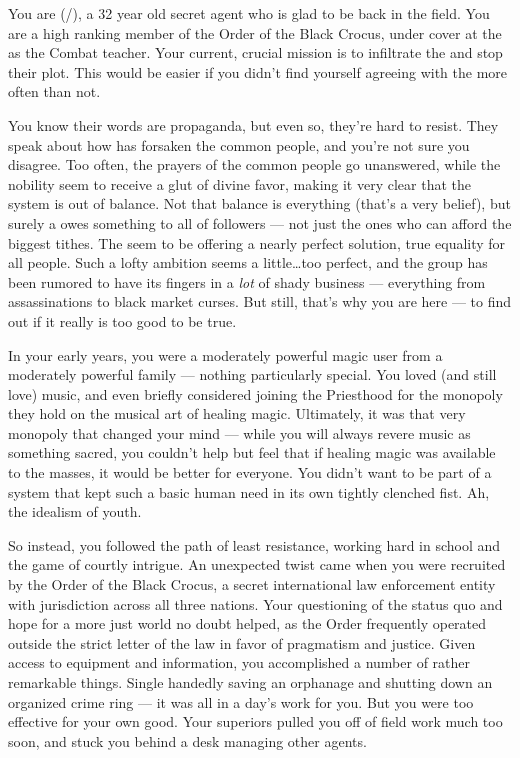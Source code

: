 \documentclass[char]{GL2020}
\begin{document}
\name{\cInterpol{}}

You are \cInterpol{\full} (\cInterpol{\they}/\cInterpol{\them}), a 32 year old secret agent who is glad to be back in the field. You are a high ranking member of the Order of the Black Crocus, under cover at the \pSchool{} as the Combat teacher. Your current, crucial mission is to infiltrate the \pGoaties{} and stop their plot. This would be easier if you didn't find yourself agreeing with the \pGoaties{} more often than not.

You know their words are propaganda, but even so, they're hard to resist. They speak about how \cFarmGod{} has forsaken the common people, and you're not sure you disagree. Too often, the prayers of the common people go unanswered, while the nobility seem to receive a glut of divine favor, making it very clear that the system is out of balance. Not that balance is everything (that's a very \pShippie{} belief), but surely a \cFarmGod{\God} owes something to all of \cFarmGod{\their} followers — not just the ones who can afford the biggest tithes. The \pGoaties{} seem to be offering a nearly perfect solution, true equality for all people. Such a lofty ambition seems a little\ldots{}too perfect, and the group has been rumored to have its fingers in a \emph{lot} of shady business — everything from assassinations to black market curses. But still, that's why you are here — to find out if it really is too good to be true.

In your early years, you were a moderately powerful magic user from a moderately powerful family — nothing particularly special. You loved (and still love) music, and even briefly considered joining the Priesthood for the monopoly they hold on the musical art of healing magic. Ultimately, it was that very monopoly that changed your mind — while you will always revere music as something sacred, you couldn't help but feel that if healing magic was available to the masses, it would be better for everyone. You didn't want to be part of a system that kept such a basic human need in its own tightly clenched fist. Ah, the idealism of youth. 

So instead, you followed the path of least resistance, working hard in school and the game of courtly intrigue. An unexpected twist came when you were recruited by the Order of the Black Crocus, a secret international law enforcement entity with jurisdiction across all three nations. Your questioning of the status quo and hope for a more just world no doubt helped, as the Order frequently operated outside the strict letter of the law in favor of pragmatism and justice. Given access to equipment and information, you accomplished a number of rather remarkable things. Single handedly saving an orphanage and shutting down an organized crime ring — it was all in a day's work for you. But you were too effective for your own good. Your superiors pulled you off of field work much too soon, and stuck you behind a desk managing other agents.
\end{document}

